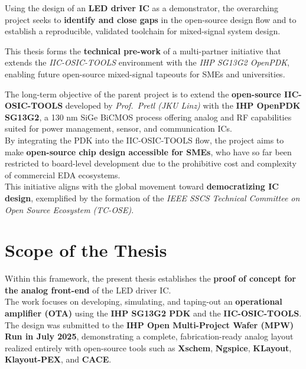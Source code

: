 \documentclass[
  11pt,
  a4paper,
  oneside]{scrbook}
\begin{document}
Using the design of an \textbf{LED driver IC} as a demonstrator, the
overarching project seeks to \textbf{identify and close gaps} in the
open-source design flow and to establish a reproducible, validated
toolchain for mixed-signal system design.

\begin{tcolorbox}[enhanced jigsaw, opacityback=0, breakable, colback=white, left=2mm, toprule=.15mm, arc=.35mm, coltitle=black, leftrule=.75mm, colbacktitle=quarto-callout-note-color!10!white, rightrule=.15mm, colframe=quarto-callout-note-color-frame, titlerule=0mm, title=\textcolor{quarto-callout-note-color}{\faInfo}\hspace{0.5em}{Project Context}, toptitle=1mm, bottomtitle=1mm, bottomrule=.15mm, opacitybacktitle=0.6]

This thesis forms the \textbf{technical pre-work} of a multi-partner
initiative that extends the \emph{IIC-OSIC-TOOLS} environment with the
\emph{IHP SG13G2 OpenPDK}, enabling future open-source mixed-signal
tapeouts for SMEs and universities.

\end{tcolorbox}

The long-term objective of the parent project is to extend the
\textbf{open-source IIC-OSIC-TOOLS} developed by \emph{Prof.~Pretl (JKU
Linz)} with the \textbf{IHP OpenPDK SG13G2}, a 130 nm SiGe BiCMOS
process offering analog and RF capabilities suited for power management,
sensor, and communication ICs.\\
By integrating the PDK into the IIC-OSIC-TOOLS flow, the project aims to
make \textbf{open-source chip design accessible for SMEs}, who have so
far been restricted to board-level development due to the prohibitive
cost and complexity of commercial EDA ecosystems.\\
This initiative aligns with the global movement toward
\textbf{democratizing IC design}, exemplified by the formation of the
\emph{IEEE SSCS Technical Committee on Open Source Ecosystem (TC-OSE)}.

\section{Scope of the Thesis}\label{scope-of-the-thesis}

Within this framework, the present thesis establishes the \textbf{proof
of concept for the analog front-end} of the LED driver IC.\\
The work focuses on developing, simulating, and taping-out an
\textbf{operational amplifier (OTA)} using the \textbf{IHP SG13G2 PDK}
and the \textbf{IIC-OSIC-TOOLS}.\\
The design was submitted to the \textbf{IHP Open Multi-Project Wafer
(MPW) Run in July 2025}, demonstrating a complete, fabrication-ready
analog layout realized entirely with open-source tools such as
\textbf{Xschem}, \textbf{Ngspice}, \textbf{KLayout},
\textbf{Klayout-PEX}, and \textbf{CACE}.
\end{document}
